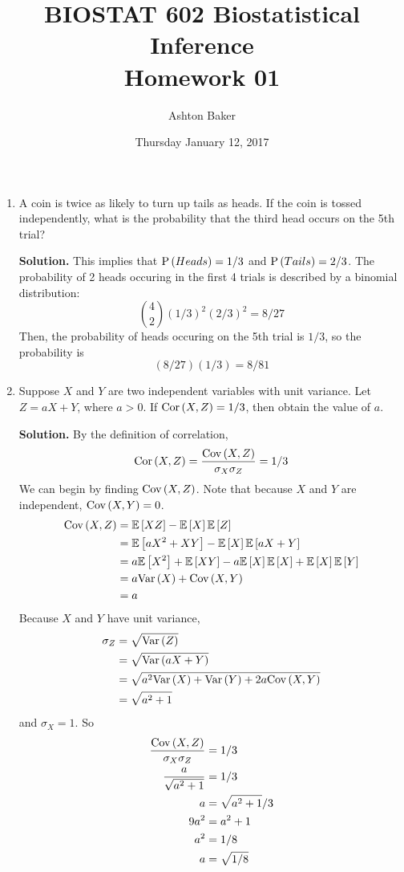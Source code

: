 \documentclass[titlepage]{article}
\begin{document}
\title{BIOSTAT 602 Biostatistical Inference\\Homework 01}
\author{Ashton Baker}
\date{Thursday January 12, 2017}
\maketitle
\begin{enumerate}
\item A coin is twice as likely to turn up tails as heads. If the coin is tossed independently, what is the probability that the third head occurs on the 5th trial?

\textbf{Solution.} This implies that $\P{Heads} = 1/3$ and $\P{Tails} = 2/3$. The probability of 2 heads occuring in the first 4 trials is described by a binomial distribution:
\[\binom{4}{2}(1/3)^2(2/3)^2 = 8/27\]
Then, the probability of heads occuring on the 5th trial is $1/3$, so the probability is
\[(8/27)(1/3) = 8/81\]

\item Suppose $X$ and $Y$ are two independent variables with unit variance. Let $Z = aX + Y$, where $a > 0$. If $\cor{X, Z} = 1/3$, then obtain the value of $a$.

\textbf{Solution.} By the definition of correlation,
\[\cor{X, Z} = \frac{\cov{X, Z}}{\sigma_X \sigma_Z} = 1/3\]
We can begin by finding $\cov{X, Z}$. Note that because $X$ and $Y$ are independent, $\cov{X, Y} = 0$.
\[\begin{aligned}
\cov{X, Z} &= \ev{XZ} - \ev{X}\ev{Z} \\
           &= \ev{aX^2 + XY} - \ev{X}\ev{aX + Y} \\
           &= a\ev{X^2} + \ev{XY} - a\ev{X}\ev{X} + \ev{X}\ev{Y} \\
           &= a \var{X} + \cov{X, Y} \\
           &= a
\end{aligned}\]
Because $X$ and $Y$ have unit variance,
\[\begin{aligned}
\sigma_Z &= \sqrt{\var{Z}} \\
         &= \sqrt{\var{aX + Y}} \\
         &= \sqrt{a^2 \var{X} + \var{Y} + 2a\cov{X, Y}} \\
         &= \sqrt{a^2 + 1}
\end{aligned}\]
and $\sigma_X = 1$. So
\[\begin{aligned}
\frac{\cov{X, Z}}{\sigma_X \sigma_Z} &= 1/3 \\
\frac{a}{\sqrt{a^2 + 1}} &= 1/3 \\
a &= \sqrt{a^2 + 1} / 3 \\
9a^2 &= a^2 + 1 \\
a^2 &= 1/8 \\
a &= \sqrt{1/8}
\end{aligned}\]


\end{enumerate}
\end{document}
